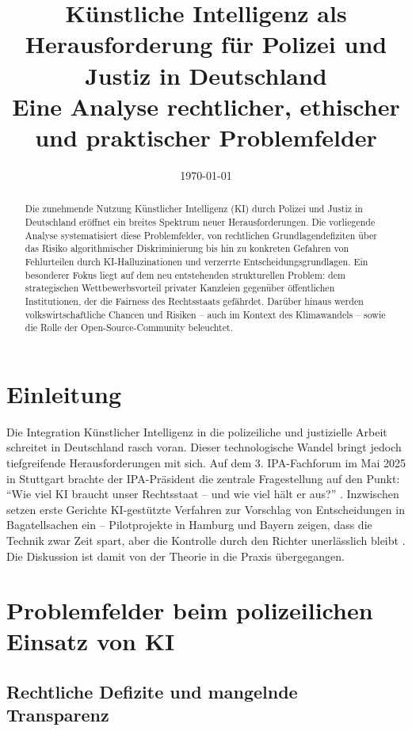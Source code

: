 \documentclass[12pt,a4paper]{article}
\title{Künstliche Intelligenz als Herausforderung für Polizei und Justiz in Deutschland\\
	\large Eine Analyse rechtlicher, ethischer und praktischer Problemfelder}
\author{}
\date{\today}
\begin{document}
	
	\maketitle
	
	\begin{abstract}
		Die zunehmende Nutzung Künstlicher Intelligenz (KI) durch Polizei und Justiz in Deutschland eröffnet ein breites Spektrum neuer Herausforderungen. Die vorliegende Analyse systematisiert diese Problemfelder, von rechtlichen Grundlagendefiziten über das Risiko algorithmischer Diskriminierung bis hin zu konkreten Gefahren von Fehlurteilen durch KI-Halluzinationen und verzerrte Entscheidungsgrundlagen. Ein besonderer Fokus liegt auf dem neu entstehenden strukturellen Problem: dem strategischen Wettbewerbsvorteil privater Kanzleien gegenüber öffentlichen Institutionen, der die Fairness des Rechtsstaats gefährdet. Darüber hinaus werden volkswirtschaftliche Chancen und Risiken – auch im Kontext des Klimawandels – sowie die Rolle der Open-Source-Community beleuchtet.
	\end{abstract}
	
	\tableofcontents
	\newpage
	
	\section{Einleitung}
	
	Die Integration Künstlicher Intelligenz in die polizeiliche und justizielle Arbeit schreitet in Deutschland rasch voran. Dieser technologische Wandel bringt jedoch tiefgreifende Herausforderungen mit sich. Auf dem 3. IPA-Fachforum im Mai 2025 in Stuttgart brachte der IPA-Präsident die zentrale Fragestellung auf den Punkt: \enquote{Wie viel KI braucht unser Rechtsstaat – und wie viel hält er aus?} \cite{IPA2025}. Inzwischen setzen erste Gerichte KI-gestützte Verfahren zur Vorschlag von Entscheidungen in Bagatellsachen ein – Pilotprojekte in Hamburg und Bayern zeigen, dass die Technik zwar Zeit spart, aber die Kontrolle durch den Richter unerlässlich bleibt \cite{LegalTech2025}. Die Diskussion ist damit von der Theorie in die Praxis übergegangen.
	
	\section{Problemfelder beim polizeilichen Einsatz von KI}
	
	\subsection{Rechtliche Defizite und mangelnde Transparenz}
	
\end{document}
